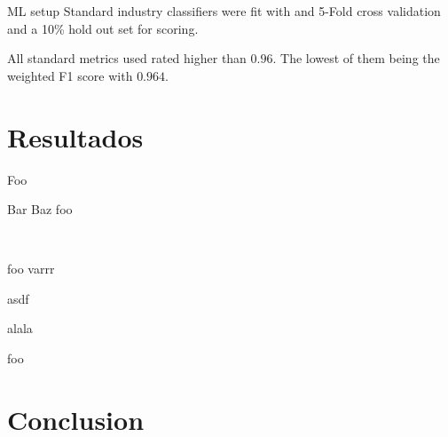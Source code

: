 \documentclass{beamer}
\begin{document}

\begin{frame}{ ML setup}
			Standard industry classifiers were fit with
			and 5-Fold cross validation and a 10\% hold out set for scoring.

			\medskip

			All standard metrics used rated higher than $0.96$. The lowest of them being the weighted F1 score with $0.964$.

%
\end{frame}


\section{Resultados}

%
%
%
%

\begin{frame}{Foo}
	\begin{block}{Bar}
		Baz
		\medskip
		foo
	\end{block}

	\pause\

	\begin{block}{foo}
		varrr

		\medskip
			asdf

		\medskip
		alala

		\medskip
		foo
	\end{block}
\end{frame}


\section{Conclusion}

\end{document}
